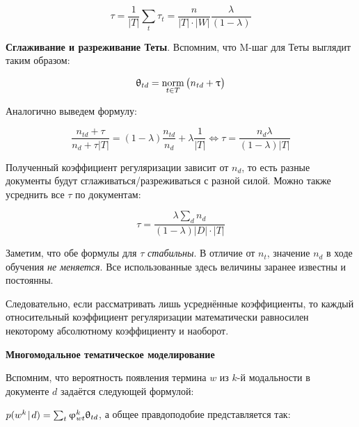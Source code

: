  

\[ 

\tau = \frac{1}{|T|} \sum_t \tau_t = \frac{n}{|T|\cdot|W|} \frac{\lambda}{(1-\lambda)} 

\] 

 

\textbf{Сглаживание и разреживание Теты}. Вспомним, что M-шаг для Теты выглядит таким образом: 

 

\[ 

\theta_{td} = \norm_{t \in T} \big( n_{td} + \tau \big) 

\] 

 

Аналогично выведем формулу: 

 

\[ 

\frac{n_{td} + \tau}{n_d + \tau |T|} = (1-\lambda) \frac{n_{td}}{n_d} + \lambda \frac{1}{|T|} \iff \tau = \frac{n_d \lambda}{(1-\lambda) |T|} \label{sp_theta_rel2abs}  

\] 

 

Полученный коэффициент регуляризации зависит от $n_d$, то есть разные документы будут сглаживаться/разреживаться с разной силой. Можно также усреднить все $\tau$ по документам: 

 

\[ 

\tau = \frac{\lambda \sum_d n_d }{(1-\lambda) |D| \cdot |T|}  

\] 

 

Заметим, что обе формулы для $\tau$ \textit{стабильны}. В отличие от $n_t$, значение $n_d$ в ходе обучения \emph{не меняется}. Все использованные здесь величины заранее известны и постоянны. 

 

Следовательно, если рассматривать лишь усреднённые коэффициенты, то каждый относительный коэффициент регуляризации математически равносилен некоторому абсолютному коэффициенту и наоборот. 

 

\textbf{Многомодальное тематическое моделирование} 

 

 

Вспомним, что вероятность появления термина $w$ из $k$-й модальности в документе $d$ задаётся следующей формулой: 

$p(w^k \mspace{2mu}{|}\mspace{2mu} d) = \sum_t \upvarphi_{wt}^k \uptheta_{td}$, а общее правдоподобие представляется так: 

